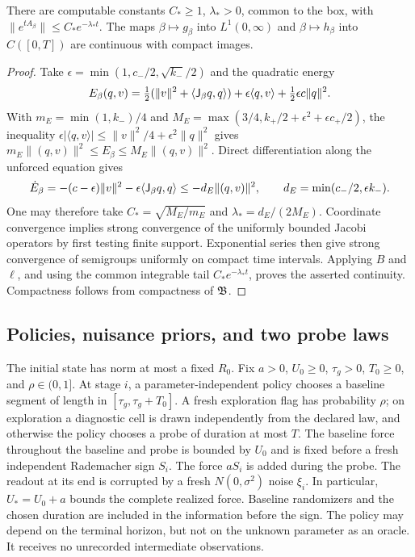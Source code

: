 \begin{lemma}
\label{lem:stability}
There are computable constants $C_*\ge1$, $\lambda_*>0$, common to the box,
with $\|e^{tA_\beta}\|\le C_*e^{-\lambda_*t}$. The maps
$\beta\mapsto g_\beta$ into $L^1(0,\infty)$ and
$\beta\mapsto h_\beta$ into $C([0,T])$ are continuous with compact images.
\end{lemma}
\begin{proof}
Take $\epsilon=\min(1,c_-/2,\sqrt{k_-}/2)$ and the quadratic energy
\[
 E_\beta(q,v)=\tfrac12(\|v\|^2+\langle\mathsf J_\beta q,q\rangle)
             +\epsilon\langle q,v\rangle+\tfrac12\epsilon c\|q\|^2.
\]
With $m_E=\min(1,k_-)/4$ and
$M_E=\max(3/4,k_+/2+\epsilon^2+\epsilon c_+/2)$, the inequality
$\epsilon|\langle q,v\rangle|\le\|v\|^2/4+\epsilon^2\|q\|^2$
gives $m_E\|(q,v)\|^2\le E_\beta\le M_E\|(q,v)\|^2$.
Direct differentiation along the unforced equation gives
\[
 \dot E_\beta=-(c-\epsilon)\|v\|^2-\epsilon\langle\mathsf J_\beta q,q\rangle
 \le-d_E\|(q,v)\|^2,\qquad d_E=\min(c_-/2,\epsilon k_-).
\]
One may therefore take $C_*=\sqrt{M_E/m_E}$ and
$\lambda_*=d_E/(2M_E)$.
Coordinate convergence implies strong convergence of the uniformly bounded
Jacobi operators by first testing finite support. Exponential series then give
strong convergence of semigroups uniformly on compact time intervals. Applying
$B$ and $\ell$, and using the common integrable tail $C_*e^{-\lambda_*t}$,
proves the asserted continuity. Compactness follows from compactness of
$\mathfrak B$.
\end{proof}

\subsection{Policies, nuisance priors, and two probe laws}
The initial state has norm at most a fixed $R_0$. Fix $a>0$, $U_0\ge0$,
$\tau_g>0$, $T_0\ge0$, and $\rho\in(0,1]$. At stage $i$, a
parameter-independent policy chooses a baseline segment of length in
$[\tau_g,\tau_g+T_0]$. A fresh exploration flag has probability $\rho$;
on exploration a diagnostic cell is drawn independently from the declared law,
and otherwise the policy chooses a probe of duration at most $T$. The baseline
force throughout the baseline and probe is bounded by $U_0$ and is fixed before
a fresh independent Rademacher sign $S_i$. The force $aS_i$ is added during the
probe. The readout at its end is corrupted by a fresh $N(0,\sigma^2)$ noise
$\xi_i$. In particular, $U_*=U_0+a$ bounds the complete realized force. Baseline
randomizers and the chosen duration are included in the information before the
sign. The policy may depend on the terminal horizon, but not on the unknown
parameter as an oracle. It receives no unrecorded intermediate observations.

